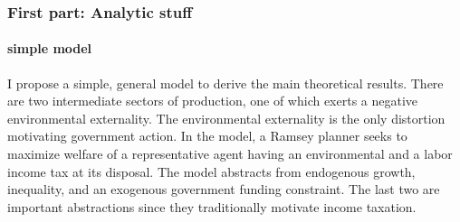  
\begin{comment}
When labor supply is fixed, environmental taxes alone can establish the efficient allocation in a representative agent economy absent fiscal distortions. Then, such a tax instrument is optimally set to the social cost of an externality, and originators internalize these social costs: the Pigou principle.
However, not redistributing environmental tax revenues reduces consumption below the efficient level and, as I demonstrate, the optimal environmental tax does not follow the Pigou principle.  If, on top, the  labor supply decision is endogenous, the environmental tax alone features too high labor supply. \tr{This results in too high environmental externality. \textbf{To be shown!}}

Lump-sum transfers of environmental tax revenues restore the efficient allocation: as households become richer, labor supply reduces. When lump-sum transfers are not available, the government can establish the efficient allocation by redistributing environmental tax revenues through an income tax scheme which I demonstrate to be progressive.

content...
\end{comment}

\subsubsection*{First part: Analytic stuff}
\paragraph{simple model}
I propose a simple, general model to derive the main theoretical results. There are two intermediate sectors of production, one of which exerts a negative environmental externality. The environmental externality is the only distortion motivating government action. In the model, a Ramsey planner seeks to maximize welfare of a representative agent having  an environmental and a labor income tax at its disposal.  
The model abstracts from  endogenous growth, inequality, and an exogenous government funding constraint. The last two are important abstractions since they traditionally motivate income taxation.

